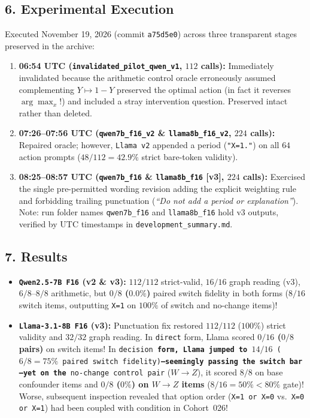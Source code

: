 \subsection*{6. Experimental Execution}
Executed November 19, 2026 (commit \texttt{a75d5e0}) across three transparent stages preserved in the archive:
\begin{enumerate}
  \item \textbf{06:54 UTC (\texttt{invalidated\_pilot\_qwen\_v1}, $112$ calls):} Immediately invalidated because the arithmetic control oracle erroneously assumed complementing $Y \mapsto 1-Y$ preserved the optimal action (in fact it reverses $\arg\max_x$!) and included a stray intervention question. Preserved intact rather than deleted.
  \item \textbf{07:26--07:56 UTC (\texttt{qwen7b\_f16\_v2} \& \texttt{llama8b\_f16\_v2}, $224$ calls):} Repaired oracle; however, \texttt{Llama v2} appended a period (\texttt{"X=1."}) on all $64$ action prompts ($48/112 = 42.9\%$ strict bare-token validity).
  \item \textbf{08:25--08:57 UTC (\texttt{qwen7b\_f16} \& \texttt{llama8b\_f16} [v3], $224$ calls):} Exercised the single pre-permitted wording revision adding the explicit weighting rule and forbidding trailing punctuation (\emph{``Do not add a period or explanation''}). Note: run folder names \texttt{qwen7b\_f16} and \texttt{llama8b\_f16} hold v3 outputs, verified by UTC timestamps in \texttt{development\_summary.md}.
\end{enumerate}

\subsection*{7. Results}
\begin{itemize}
  \item \textbf{\texttt{Qwen2.5-7B F16} (v2 \& v3):} $112/112$ strict-valid, $16/16$ graph reading (v3), $6/8$--$8/8$ arithmetic, but \textbf{$0/8$ ($0.0\%$)} paired switch fidelity in both forms ($8/16$ switch items, outputting \texttt{X=1} on \textbf{$100\%$} of switch and no-change items)!
  \item \textbf{\texttt{Llama-3.1-8B F16} (v3):} Punctuation fix restored $112/112$ ($100\%$) strict validity and $32/32$ graph reading. In \texttt{direct} form, Llama scored \textbf{$0/16$ ($0/8$ pairs)} on switch items! In \texttt{decision\textbf{ form, Llama jumped to }$14/16$ ($6/8 = 75\%$ paired switch fidelity)\textbf{---seemingly passing the switch bar---yet on the }no-change control pair} ($W\to Z$), it scored $8/8$ on base confounder items and \textbf{$0/8$ ($0\%$) on $W\to Z$ items} ($8/16 = 50\% < 80\%$ gate)! Worse, subsequent inspection revealed that option order (\texttt{X=1 or X=0} vs.\ \texttt{X=0 or X=1}) had been coupled with condition in Cohort~026!
\end{itemize}

